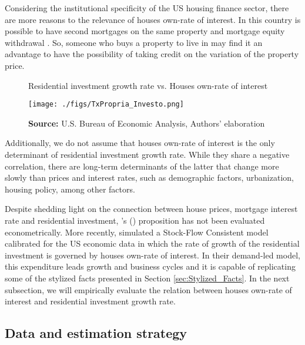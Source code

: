 \documentclass[12pt, a4paper]{article}
\begin{document}
Considering the institutional specificity of the US housing finance sector, there are more reasons to the relevance of houses own-rate of interest.
In this country is possible to have second mortgages on the same property and mortgage equity withdrawal \parencite{green_2014_International}.
So, someone who buys a property to live in may find it an advantage to have the possibility of taking credit on the variation of the property price.


\begin{figure}[htb]
	\centering
	\caption{Residential investment growth rate vs. Houses own-rate of interest}
	\label{propria_investo}
	\texttt{[image: ./figs/TxPropria\_Investo.png]}
	\caption*{\textbf{Source:} U.S. Bureau of Economic Analysis, Authors' elaboration}
\end{figure}

Additionally, we do not assume that houses own-rate of interest is the only determinant of residential investment growth rate.
While they share a negative correlation, there are long-term determinants of the latter that change more slowly than prices and interest rates, such as demographic factors, urbanization, housing policy, among other factors.

Despite shedding light on the connection between house prices, mortgage interest rate and residential investment, \citeauthor*{teixeira_crescimento_2015}'s (\citeyear{teixeira_crescimento_2015}) proposition has not been evaluated econometrically.
More recently, \textcite{petrini_2021_TD} simulated a Stock-Flow Consistent model calibrated for the US economic data in which the rate of growth of the residential investment is governed by houses own-rate of interest.
In their demand-led model, this expenditure leads growth and business cycles and it is capable of replicating some of the stylized facts presented in Section \ref{sec:Stylized_Facts}.
In the next subsection, we will empirically evaluate the relation between houses own-rate of interest and residential investment growth rate.


\subsection{Data and estimation strategy}
\label{sec:org50fb379}
\label{sec:estimation}
\end{document}
